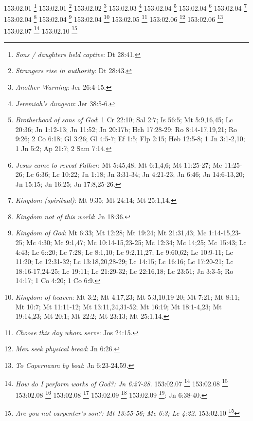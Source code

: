 {{{{{{{{{{{{{{{{{{{{{{{{{{{{{{153:02.01 \footnote{\textit{Sons / daughters held captive}: Dt 28:41.}
153:02.01 \footnote{\textit{Strangers rise in authority}: Dt 28:43.}
153:02.02 \footnote{\textit{Another Warning}: Jer 26:4-15.}
153:02.03 \footnote{\textit{Jeremiah's dungeon}: Jer 38:5-6.}
153:02.04 \footnote{\textit{Brotherhood of sons of God}: 1 Cr 22:10; Sal 2:7; Is 56:5; Mt 5:9,16,45; Lc 20:36; Jn 1:12-13; Jn 11:52; Jn 20:17b; Hch 17:28-29; Ro 8:14-17,19,21; Ro 9:26; 2 Co 6:18; Gl 3:26; Gl 4:5-7; Ef 1:5; Flp 2:15; Heb 12:5-8; 1 Jn 3:1-2,10; 1 Jn 5:2; Ap 21:7; 2 Sam 7:14.}
153:02.04 \footnote{\textit{Jesus came to reveal Father}: Mt 5:45,48; Mt 6:1,4,6; Mt 11:25-27; Mc 11:25-26; Lc 6:36; Lc 10:22; Jn 1:18; Jn 3:31-34; Jn 4:21-23; Jn 6:46; Jn 14:6-13,20; Jn 15:15; Jn 16:25; Jn 17:8,25-26.}
153:02.04 \footnote{\textit{Kingdom (spiritual)}: Mt 9:35; Mt 24:14; Mt 25:1,14.}
153:02.04 \footnote{\textit{Kingdom not of this world}: Jn 18:36.}
153:02.04 \footnote{\textit{Kingdom of God}: Mt 6:33; Mt 12:28; Mt 19:24; Mt 21:31,43; Mc 1:14-15,23-25; Mc 4:30; Mc 9:1,47; Mc 10:14-15,23-25; Mc 12:34; Mc 14;25; Mc 15:43; Lc 4:43; Lc 6::20; Lc 7:28; Lc 8:1,10; Lc 9:2,11,27; Lc 9:60,62; Lc 10:9-11; Lc 11:20; Lc 12:31-32; Lc 13:18,20,28-29; Lc 14:15; Lc 16:16; Lc 17:20-21; Lc 18:16-17,24-25; Lc 19:11; Lc 21:29-32; Lc 22:16,18; Lc 23:51; Jn 3:3-5; Ro 14:17; 1 Co 4:20; 1 Co 6:9.}
153:02.04 \footnote{\textit{Kingdom of heaven}: Mt 3:2; Mt 4:17,23; Mt 5:3,10,19-20; Mt 7:21; Mt 8:11; Mt 10:7; Mt 11:11-12; Mt 13:11,24,31-52; Mt 16:19; Mt 18:1-4,23; Mt 19:14,23; Mt 20:1; Mt 22:2; Mt 23:13; Mt 25:1,14.}
153:02.05 \footnote{\textit{Choose this day whom serve}: Jos 24:15.}
153:02.06 \footnote{\textit{Men seek physical bread}: Jn 6:26.}
153:02.06 \footnote{\textit{To Capernaum by boat}: Jn 6:23-24,59.}
153:02.07 \footnote{\textit{How do I perform works of God?: Jn 6:27-28.}
153:02.07 \footnote{\textit{Should seek spiritual bread}: Jn 6:27.}
153:02.08 \footnote{\textit{I am the bread of life}: Jn 6:34-37.}
153:02.08 \footnote{\textit{Manna in wilderness}: Ex 16:14-15.}
153:02.08 \footnote{\textit{Manna vs. bread of life}: Jn 6:30-33.}
153:02.09 \footnote{\textit{All who believe have eternal life}: Jn 3:16.}
153:02.09 \footnote{\textit{Will of God}: eternal life}: Jn 6:38-40.}
153:02.10 \footnote{\textit{Are you not carpenter's son?: Mt 13:55-56; Mc 6:3; Lc 4:22.}
153:02.10 \footnote{\textit{Are you not human?: Jn 6:41-42.}
153:02.11 \footnote{\textit{All shall be taught by God}: Is 54:13.}
153:02.11 \footnote{\textit{Believers have eternal life}: Dn 12:2; Mt 19:16,29; Mt 25:46; Mc 10:17,30; Lc 10:25; Lc 18:18,30; Jn 3:15-16,36; Jn 4:14,36; Jn 5:24,39; Jn 6:27,40,47; Jn 6:54:68; Jn 8:51-52; Jn 10:28; Jn 11:25-26; Jn 12:25,50; Jn 17:2-3; Hch 13:46-48; Ro 2:7; Ro 5:21; Ro 6:22-23; Gl 6:8; 1 Ti 1:16; 1 Ti 6:12,19; Tit 1:2; Tit 3:7; 1 Jn 1:2; 1 Jn 2:25; 1 Jn 3:15; 1 Jn 5:11,13,20; Jud 1:21; Ap 22:5.}
}}}}}}}}}}}}}}}}}}}}}}}}}}}}}}}}
